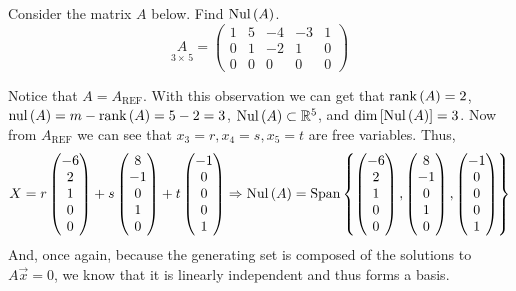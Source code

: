 \begin{example}{}{}
    Consider the matrix $A$ below. Find $\text{Nul}\left(A\right)$. 
    \[
        \underset{3\times\,5}{A} = \begin{pmatrix}
            1 & 5 & -4 & -3 & 1 \\
            0 & 1 & -2 & 1 & 0 \\
            0 & 0 & 0 & 0 & 0
        \end{pmatrix}
    \]

    \begin{solution}
        Notice that $A=A_{\text{REF}}$. With this observation we can get that $\text{rank}\left(A\right)=2$, $\text{nul}\left(A\right) = m - \text{rank}\left(A\right) = 5 - 2 = 3$, $\text{Nul}\left(A\right) \subset \mathbb R^{5}$, and $\dim\left[\text{Nul}\left(A\right)\right] = 3$. Now from $A_{\text{REF}}$ we can see that $x_3 = r, x_4 = s, x_5=t$ are free variables. Thus, 
        \[
            X = r\begin{pmatrix}
                -6 \\ 2 \\ 1 \\ 0 \\ 0
            \end{pmatrix} 
            + s\begin{pmatrix}
                8 \\ -1 \\ 0 \\ 1 \\ 0
            \end{pmatrix}
            + t\begin{pmatrix}
                -1 \\ 0 \\ 0 \\ 0 \\ 1
            \end{pmatrix}
            \Rightarrow
            \text{Nul}\left(A\right) = \text{Span}\left\{
                \begin{pmatrix}
                    -6 \\ 2 \\ 1 \\ 0 \\ 0
                \end{pmatrix},
                \begin{pmatrix}
                    8 \\ -1 \\ 0 \\ 1 \\ 0
                \end{pmatrix},
                \begin{pmatrix}
                    -1 \\ 0 \\ 0 \\ 0 \\ 1
                \end{pmatrix}
             \right\}
        \]
        And, once again, because the generating set is composed of the solutions to $A\vec{x} = 0$, we know that it is linearly independent and thus forms a basis.
    \end{solution}
\end{example}